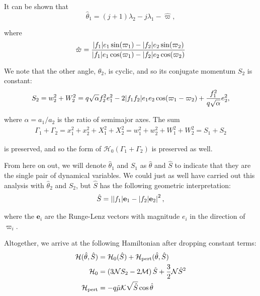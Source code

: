 \documentclass[usenatbib,twocolumn]{mnras}
\DeclarePairedDelimiter{\abs}{|}{|}
\begin{document}
\noindent
It can be shown that
\begin{equation}
  \hat{\theta}_1 = (j+1)\lambda_2-j\lambda_1
  - \hat\varpi,
\end{equation}

\noindent
where
\begin{equation}
\hat\varpi = \frac{\abs{f_1} e_1\sin(\varpi_1) -
  \abs{f_2}e_2\sin(\varpi_2)} {\abs{f_1}e_1\cos(\varpi_1) -
  \abs{f_2}e_2\cos(\varpi_2)}
\end{equation}

\noindent
We note that the other angle, \(\hat\theta_2\),
is cyclic, and so its conjugate momentum \(S_2\) is constant:
\begin{align}
\label{eq:appS2deriv}
  S_2 = w_2^2 + W_2^2 = q\sqrt{\alpha}f_2^2e_1^2
-2\abs{f_1f_2}e_1e_2\cos(\varpi_1-\varpi_2) + \frac{f_1^2}{q\sqrt\alpha}e_2^2
,
\end{align}

\noindent
where \(\alpha=a_1/a_2\) is the ratio of semimajor axes.
The sum
\begin{align}
  \Gamma_1 +\Gamma_2 = x_1^2+x_2^2 + X_1^2 + X_2^2
  = w_1^2+w_2^2 + W_1^2 + W_2^2 = S_1 + S_2
\end{align}

\noindent
is preserved, and so the form of \(\mathcal H_0(\Gamma_1+\Gamma_2)\)
is preserved as well.

From here on out, we will denote \(\hat\theta_1\) and \(S_1\) as
\(\hat\theta\) and \(\hat S\) to indicate that they are the single pair of
dynamical variables.  We could just as well have carried out this
analysis with \(\hat\theta_2\) and \(S_2\), but \(\hat S\) has the following
geometric interpretation:
\begin{align}
  \hat S = \left\lvert \abs{f_1}\mathbf{e}_1 - \abs{f_2}\mathbf{e}_2\right\rvert^2,
\end{align}

\noindent
where the \(\mathbf{e}_i\) are the Runge-Lenz vectors with magnitude
\(e_i\) in the direction of \(\varpi_i\).  

Altogether, we arrive at the following Hamiltonian after
dropping constant terms:
\begin{align}
  \label{eq:HShat}\mathcal H(\hat \theta, \hat S) &= \mathcal H_0(\hat S) + \mathcal H_{\rm pert}(\hat \theta, \hat S) \\
  \mathcal H_0
  &= \left( 3\mathcal NS_2 -2\mathcal M\right) \hat S
    + \frac32 \mathcal N \hat S^2 \\
  \mathcal H_{\rm pert}
  &= - q\tilde\mu\mathcal K\sqrt{\hat S}\cos\hat\theta
\end{align}
\end{document}
